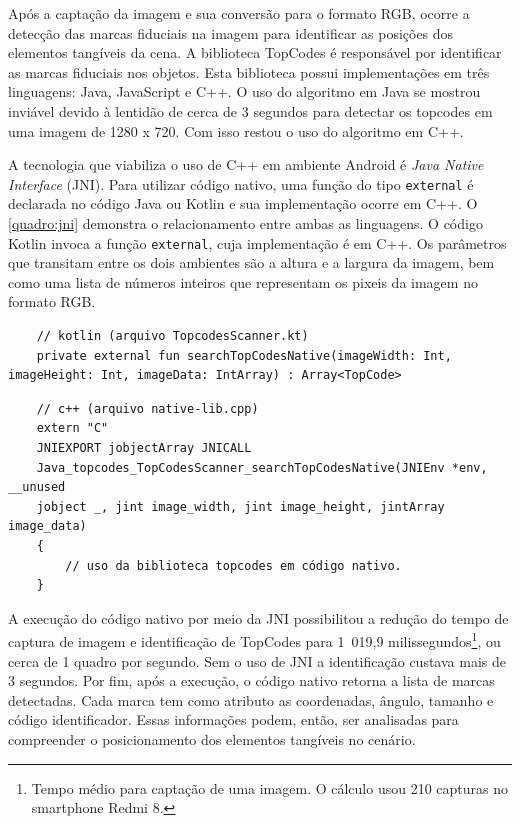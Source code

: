 Após a captação da imagem e sua conversão para o formato RGB, ocorre a detecção das marcas fiduciais na imagem para identificar as posições dos elementos tangíveis da cena. A biblioteca TopCodes é responsável por identificar as marcas fiduciais nos objetos. Esta biblioteca possui implementações em três linguagens: Java, JavaScript e C++. O uso do algoritmo em Java se mostrou inviável devido à lentidão de cerca de 3 segundos para detectar os topcodes em uma imagem de 1280 x 720. Com isso restou o uso do algoritmo em C++.

A tecnologia que viabiliza o uso de C++ em ambiente Android é \textit{Java Native Interface} (JNI). Para utilizar código nativo, uma função do tipo \texttt{external} é declarada no código Java ou Kotlin e sua implementação ocorre em C++. O \autoref{quadro:jni} demonstra o relacionamento entre ambas as linguagens. O código Kotlin invoca a função \texttt{external}, cuja implementação é em C++. Os parâmetros que transitam entre os dois ambientes são a altura e a largura da imagem, bem como uma lista de números inteiros que representam os pixeis da imagem no formato RGB.

\begin{quadro}[!h]
    \begin{verbatim}
    // kotlin (arquivo TopcodesScanner.kt)
    private external fun searchTopCodesNative(imageWidth: Int, imageHeight: Int, imageData: IntArray) : Array<TopCode>
    \end{verbatim}
    
    \begin{verbatim}
    // c++ (arquivo native-lib.cpp)
    extern "C" 
    JNIEXPORT jobjectArray JNICALL
    Java_topcodes_TopCodesScanner_searchTopCodesNative(JNIEnv *env, __unused 
    jobject _, jint image_width, jint image_height, jintArray image_data) 
    { 
        // uso da biblioteca topcodes em código nativo.
    }
    \end{verbatim}
    \label{quadro:jni}
\end{quadro}

A execução do código nativo por meio da JNI possibilitou a redução do tempo de captura de imagem e identificação de TopCodes para 1 019,9 milissegundos\footnote{Tempo médio para captação de uma imagem. O cálculo usou 210 capturas no smartphone Redmi 8. }, ou cerca de 1 quadro por segundo. Sem o uso de JNI a identificação custava mais de 3 segundos. 
Por fim, após a execução, o código nativo retorna a lista de marcas detectadas. Cada marca tem como atributo as coordenadas, ângulo, tamanho e código identificador. Essas informações podem, então, ser analisadas para compreender o posicionamento dos elementos tangíveis no cenário.

